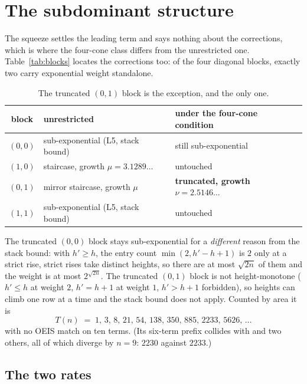 \documentclass[11pt]{article}
\begin{document}
\section{The subdominant structure}
\label{sec:subdominant}

The squeeze settles the leading term and says nothing about the corrections,
which is where the four-cone class differs from the unrestricted one.
Table~\ref{tab:blocks} locates the corrections too: of the four diagonal blocks,
exactly two carry exponential weight standalone.

\begin{table}[H]
\centering\small
\begin{tabular}{c l l}
\toprule
block & unrestricted & under the four-cone condition \\
\midrule
$(0,0)$ & sub-exponential (L5, stack bound) & still sub-exponential \\
$(1,0)$ & staircase, growth $\mu = 3.1289\dots$ & untouched \\
$(0,1)$ & mirror staircase, growth $\mu$ & \textbf{truncated, growth $\nu = 2.5146\dots$} \\
$(1,1)$ & sub-exponential (L5, stack bound) & untouched \\
\bottomrule
\end{tabular}
\caption{The truncated $(0,1)$ block is the exception, and the only one.}
\label{tab:subdom}
\end{table}

The truncated $(0,0)$ block stays sub-exponential for a \emph{different} reason
from the stack bound: with $h' \ge h$, the entry count
$\min(2, h'-h+1)$ is $2$ only at a strict rise, strict rises take distinct
heights, so there are at most $\sqrt{2n}$ of them and the weight is at most
$2^{\sqrt{2n}}$. The truncated $(0,1)$ block is not height-monotone ($h' \le
h$ at weight $2$, $h' = h+1$ at weight $1$, $h' > h+1$ forbidden), so heights
can climb one row at a time and the stack bound does not apply. Counted
by area it is
\[
  T(n) \;=\; 1,\, 3,\, 8,\, 21,\, 54,\, 138,\, 350,\, 885,\, 2233,\, 5626,\, \dots
\]
with no OEIS match on ten terms. (Its six-term prefix collides with
 and two others, all of which diverge by $n = 9$: $2230$ against
$2233$.)

\subsection{The two rates}
\end{document}
